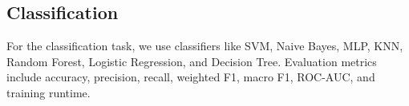 \documentclass[]{Liebert_Author_revised}
\begin{document}


\subsection{Classification}
For the classification task, we use classifiers like SVM, Naive Bayes, MLP, KNN, Random Forest, Logistic Regression, and Decision Tree. Evaluation metrics include accuracy, precision, recall, weighted F1, macro F1, ROC-AUC, and training runtime. 
\end{document}

